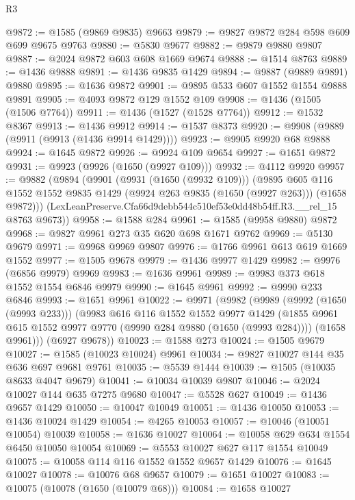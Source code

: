\begin{lexlean}{R3}
\begin{coremodule}
@9872 := @1585 (@9869 @9835) @9663
@9879 := @9827 @9872 @284 @598 @609 @699 @9675 @9763
@9880 := @5830 @9677
@9882 := @9879 @9880 @9807
@9887 := @2024 @9872 @603 @608 @1669 @9674
@9888 := @1514 @8763
@9889 := @1436 @9888
@9891 := @1436 @9835 @1429
@9894 := @9887 (@9889 @9891) @9880
@9895 := @1636 @9872
@9901 := @9895 @533 @607 @1552 @1554 @9888 @9891
@9905 := @4093 @9872 @129 @1552 @109
@9908 := @1436 (@1505 (@1506 @7764))
@9911 := @1436 (@1527 (@1528 @7764))
@9912 := @1532 @8367
@9913 := @1436 @9912
@9914 := @1537 @8373
@9920 := @9908 (@9889 (@9911 (@9913 (@1436 @9914 @1429))))
@9923 := @9905 @9920 @68 @9888
@9924 := @1645 @9872
@9926 := @9924 @109 @9654
@9927 := @1651 @9872
@9931 := @9923 (@9926 (@1650 (@9927 @109)))
@9932 := @4112 @9920
@9957 := @9882
    (@9894
      (@9901
        (@9931 (@1650 (@9932 @109)))
        (@9895
          @605
          @116
          @1552
          @1552
          @9835
          @1429
          (@9924 @263 @9835 (@1650 (@9927 @263)))
          (@1658 @9872)))
      (LexLeanPreserve.Cfa66d9debb544c510ef53e0dd48b54ff.R3.__rel_15 @8763 @9673))
@9958 := @1588 @284
@9961 := @1585 (@9958 @9880) @9872
@9968 := @9827 @9961 @273 @35 @620 @698 @1671 @9762
@9969 := @5130 @9679
@9971 := @9968 @9969 @9807
@9976 := @1766 @9961 @613 @619 @1669 @1552
@9977 := @1505 @9678
@9979 := @1436 @9977 @1429
@9982 := @9976 (@6856 @9979) @9969
@9983 := @1636 @9961
@9989 := @9983 @373 @618 @1552 @1554 @6846 @9979
@9990 := @1645 @9961
@9992 := @9990 @233 @6846
@9993 := @1651 @9961
@10022 := @9971
    (@9982
      (@9989
        (@9992 (@1650 (@9993 @233)))
        (@9983
          @616
          @116
          @1552
          @1552
          @9977
          @1429
          (@1855 @9961 @615 @1552 @9977 @9770 (@9990 @284 @9880 (@1650 (@9993 @284))))
          (@1658 @9961)))
      (@6927 @9678))
@10023 := @1588 @273
@10024 := @1505 @9679
@10027 := @1585 (@10023 @10024) @9961
@10034 := @9827 @10027 @144 @35 @636 @697 @9681 @9761
@10035 := @5539 @1444
@10039 := @1505 (@10035 @8633 @4047 @9679)
@10041 := @10034 @10039 @9807
@10046 := @2024 @10027 @144 @635 @7275 @9680
@10047 := @5528 @627
@10049 := @1436 @9657 @1429
@10050 := @10047 @10049
@10051 := @1436 @10050
@10053 := @1436 @10024 @1429
@10054 := @4265 @10053
@10057 := @10046 (@10051 @10054) @10039
@10058 := @1636 @10027
@10064 := @10058 @629 @634 @1554 @6450 @10050 @10054
@10069 := @5553 @10027 @627 @117 @1554 @10049
@10075 := @10058 @114 @116 @1552 @1552 @9657 @1429
@10076 := @1645 @10027
@10078 := @10076 @68 @9657
@10079 := @1651 @10027
@10083 := @10075 (@10078 (@1650 (@10079 @68)))
@10084 := @1658 @10027

\end{coremodule}
\end{lexlean}
